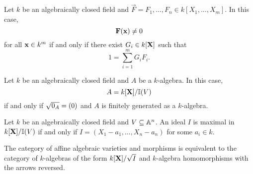 \documentclass{ximera}
\begin{document}
\begin{corollary}
  Let $k$ be an algebraically closed field and $\vec{F} =
  F_1,\dots,F_n\in k[X_1,\dots,X_m]$. In this case,
  \[
  \mathbf{F}(\mathbf{x}) \ne 0
  \]
  for all $\mathbf{x}\in k^m$ if and only if there exist $G_i\in k[\mathbf X]$ such that
  \[
  1 = \sum_{i=1}^m G_i F_i.
  \]
\end{corollary}

\begin{corollary}
  Let $k$ be an algebraically closed field and $A$ be a $k$-algebra.
  In this case,
  \[
  A = k[\mathbf X]/\mathbb I(V) 
  \]
  if and only if $\sqrt{0_A} = (0)$ and $A$ is finitely generated as a
  $k$-algebra.
\end{corollary}


\begin{corollary}
  Let $k$ be an algebraically closed field and $V\subseteq\mathbb A^n$. An ideal $I$ is maximal in
  $k[\mathbf X]/\mathbb I(V)$ if and only if $I= (X_1-a_1,\dots,X_n-a_n)$ for some $a_i\in
  k$.
\end{corollary}

\begin{corollary}
  The category of affine algebraic varieties and morphisms is
  equivalent to the category of $k$-algebras of the form
  $k[\mathbf X]/\sqrt{I}$ and $k$-algebra homomorphisms with the arrows
  reversed.
\end{corollary}
\end{document}

